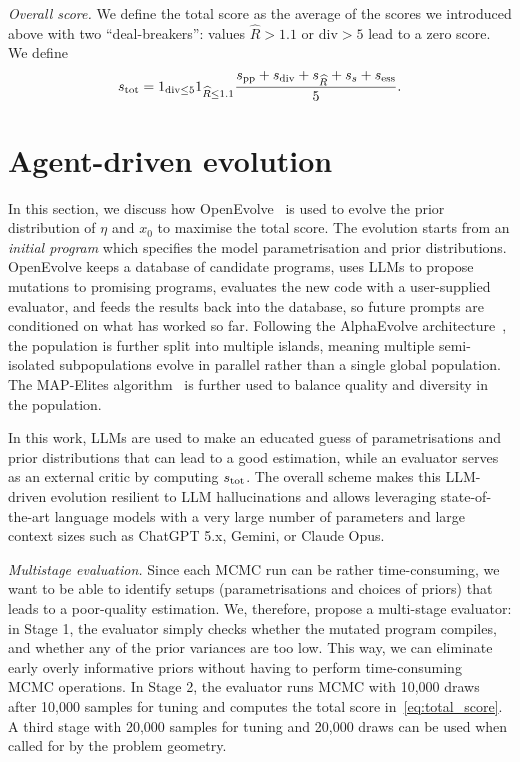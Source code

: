 \documentclass[11pt]{report}
\begin{document}
\textit{Overall score.}
We define the total score as the average of the scores 
we introduced above with two ``deal-breakers'': values
$\widehat{R} > 1.1$ or $\mathrm{div} > 5$ lead to a zero 
score. We define
\begin{equation}
  s_{\rm tot}
  =
  1_{\mathrm{div}\leq 5}
  1_{\widehat{R} \leq 1.1}
  \frac{
  s_{\mathrm{pp}} + s_{\mathrm{div}} + s_{\widehat R} + s_{s} + s_{\mathrm{ess}}
  }{5}.
  \label{eq:total_score}
\end{equation}


\section{Agent-driven evolution}\label{sec:evolution}
In this section, we discuss how OpenEvolve~\cite{openevolve} is 
used to evolve the prior distribution of $\eta$ and $x_0$
to maximise the total score.
The evolution starts from an \textit{initial program}
which specifies the model parametrisation and 
prior distributions.
OpenEvolve keeps a database of candidate programs, 
uses LLMs to propose mutations to promising programs, 
evaluates the new code with a user-supplied evaluator, 
and feeds the results back into the database, so future 
prompts are conditioned on what has worked so far.
Following the AlphaEvolve architecture~\cite{AlphaEvolve2025},
the population is further split into multiple islands, 
meaning multiple semi-isolated subpopulations evolve 
in parallel rather than a single global population.
The MAP-Elites algorithm~\cite{MouretClune2015} is further 
used to balance quality and diversity in the population.

In this work, LLMs are used to make an educated guess of 
parametrisations and prior distributions that can lead 
to a good estimation, while an evaluator serves as an 
external critic by computing $s_{\rm tot}$.
The overall scheme makes this LLM-driven evolution 
resilient to LLM hallucinations and allows leveraging
state-of-the-art language models with a very large number of 
parameters and large context sizes
such as ChatGPT 5.x, Gemini, or Claude Opus.

\textit{Multistage evaluation.}\label{sec:multistageEval}
Since each MCMC run can be rather time-consuming, we want 
to be able to identify setups (parametrisations and 
choices of priors) that leads to a poor-quality estimation.
We, therefore, propose a multi-stage evaluator: 
in Stage 1, the evaluator simply checks whether the mutated 
program compiles, and whether any of the prior variances
are too low. This way, we can eliminate early overly 
informative priors without having to perform time-consuming 
MCMC operations.
In Stage 2, the evaluator runs MCMC with 10,000 draws 
after 10,000 samples for tuning and computes the total 
score in~\eqref{eq:total_score}.
A third stage with 20,000 samples for tuning and 20,000
draws can be used when called for by the problem geometry.
\end{document}

